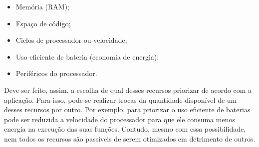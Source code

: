 \begin{itemize}

    \item Memória (\gls{RAM});
    \item Espaço de código;
    \item Ciclos de processador ou velocidade;
    \item Uso eficiente de bateria (economia de energia);
    \item Periféricos do processador.
    
\end{itemize}   


Deve ser feito, assim, a escolha de qual desses recursos priorizar de acordo com a aplicação. Para isso, pode-se realizar trocas da quantidade disponível de um desses recursos por outro. Por exemplo, para priorizar o uso eficiente de baterias pode ser reduzida a velocidade do processador para que ele consuma menos energia na execução das suas funções. Contudo, mesmo com essa possibilidade, nem todos os recursos são passíveis de serem otimizados em detrimento de outros. \cite{white2011making}






